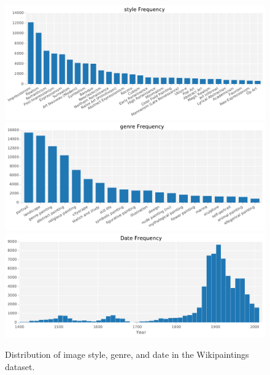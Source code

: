 \begin{figure}[th]
\centering
\includegraphics[width=\linewidth]{../style/figures/wikipaintings_style.pdf}\\
\includegraphics[width=\linewidth]{../style/figures/wikipaintings_genre.pdf}\\
\includegraphics[width=\linewidth]{../style/figures/wikipaintings_date.pdf}
\caption{Distribution of image style, genre, and date in the Wikipaintings dataset.}
\label{fig:wikipaintings_data}
\end{figure}


